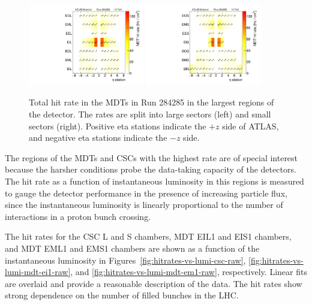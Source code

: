 \begin{figure}
  \begin{center}
    \includegraphics[width=0.45\textwidth]{./figures/rate_raw_vs_region_L_00284285.pdf}
    \includegraphics[width=0.45\textwidth]{./figures/rate_raw_vs_region_S_00284285.pdf}
    \caption{Total hit rate in the MDTs in Run 284285 in the largest regions of the detector. The rates are split into large sectors (left) and small sectors (right). Positive eta stations indicate the $+z$ side of ATLAS, and negative eta stations indicate the $-z$ side.}
    \label{fig:hitrates-vs-region-raw}
  \end{center}
\end{figure}

The regions of the MDTs and CSCs with the highest rate are of special interest because the harsher conditions probe the data-taking capacity of the detectors. The hit rate as a function of instantaneous luminosity in this regions is measured to gauge the detector performance in the presence of increasing particle flux, since the instantaneous luminosity is linearly proportional to the number of interactions in a proton bunch crossing.

The hit rates for the CSC L and S chambers, MDT EIL1 and EIS1 chambers, and MDT EML1 and EMS1 chambers are shown as a function of the instantaneous luminosity in Figures~\ref{fig:hitrates-vs-lumi-csc-raw}, \ref{fig:hitrates-vs-lumi-mdt-ei1-raw}, and \ref{fig:hitrates-vs-lumi-mdt-em1-raw}, respectively. Linear fits are overlaid and provide a reasonable description of the data. The hit rates show strong dependence on the number of filled bunches in the LHC.


